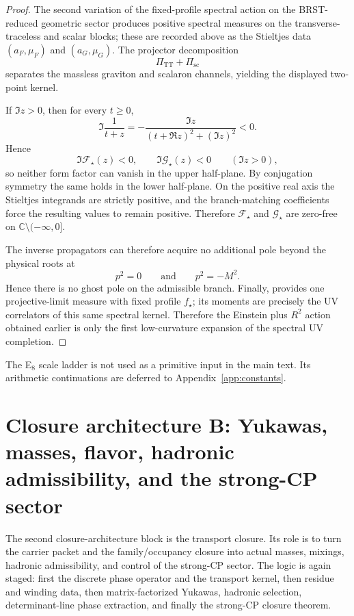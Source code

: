\documentclass[11pt,a4paper]{article}
\theoremstyle{definition}
\theoremstyle{remark}
\begin{document}
\begin{proof}
The second variation of the fixed-profile spectral action on the BRST-reduced geometric sector
produces positive spectral measures on the transverse-traceless and scalar blocks; these are
recorded above as the Stieltjes data $(a_F,\mu_F)$ and $(a_G,\mu_G)$. The projector decomposition
\[
\Pi_{\mathrm{TT}}+\Pi_{\mathrm{sc}}
\]
separates the massless graviton and scalaron channels, yielding the displayed two-point kernel.

If $\Im z>0$, then for every $t\ge 0$,
\[
\Im\frac{1}{t+z}
=
-\frac{\Im z}{(t+\Re z)^2+(\Im z)^2}
<0.
\]
Hence
\[
\Im \mathcal F_\star(z)<0,
\qquad
\Im \mathcal G_\star(z)<0
\qquad
(\Im z>0),
\]
so neither form factor can vanish in the upper half-plane. By conjugation symmetry the same holds
in the lower half-plane. On the positive real axis the Stieltjes integrands are strictly positive,
and the branch-matching coefficients force the resulting values to remain positive. Therefore
$\mathcal F_\star$ and $\mathcal G_\star$ are zero-free on
$\mathbb C\setminus(-\infty,0]$.

The inverse propagators can therefore acquire no additional pole beyond the physical roots at
\[
p^2=0
\qquad\text{and}\qquad
p^2=-M^2.
\]
Hence there is no ghost pole on the admissible branch. Finally,
 provides one projective-limit measure with fixed profile
$f_\star$; its moments are precisely the UV correlators of this same spectral kernel. Therefore the
Einstein plus $R^2$ action obtained earlier is only the first low-curvature expansion of the
spectral UV completion.
\end{proof}

The E$_8$ scale ladder is not used as a primitive input in the main text. Its arithmetic
continuations are deferred to Appendix~\ref{app:constants}.

\section{Closure architecture B: Yukawas, masses, flavor, hadronic admissibility, and the strong-CP sector}

The second closure-architecture block is the transport closure. Its role is to turn the carrier
packet and the family/occupancy closure into actual masses, mixings, hadronic admissibility, and
control of the strong-CP sector. The logic is again staged: first the discrete phase operator and
the transport kernel, then residue and winding data, then matrix-factorized Yukawas, hadronic
selection, determinant-line phase extraction, and finally the strong-CP closure theorem.
\end{document}
